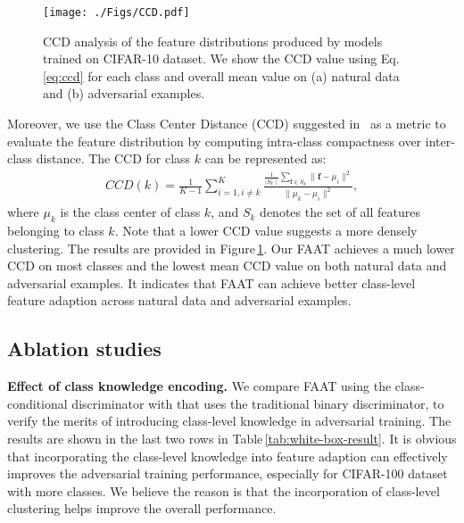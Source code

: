 \documentclass[10pt,twocolumn,letterpaper]{article}
\begin{document}
\begin{figure}[!t]
\centering
\texttt{[image: ./Figs/CCD.pdf]}
    \caption{CCD analysis of the feature distributions produced by models trained on CIFAR-10 dataset. We show the CCD value using Eq.\,\eqref{eq:ccd} for each class and overall mean value on (a) natural data and (b) adversarial examples.}
\label{fig:ccd}
\end{figure}

Moreover, we use the Class Center Distance (CCD) suggested in~\cite{Haoran_2020_ECCV} as a metric to evaluate the feature distribution by computing intra-class compactness over inter-class distance. The CCD for class $k$ can be represented as:
\begin{equation}
\begin{aligned}
\label{eq:ccd}
		CCD(k)=\frac{1}{K-1}\sum \limits_{i=1,i\neq k} ^{K}\frac{\frac{1}{\mid S_k\mid}\sum_{\mathbf{f}\in S_k}\|\mathbf{f}-\mu_i\|^2}{\|\mu_k-\mu_i\|^2},
\end{aligned}
\end{equation}
where $\mu_k$ is the class center of class $k$, and $S_k$ denotes the set of all features belonging to class $k$. Note that a lower CCD value suggests a more densely clustering. The results are provided in Figure\,\ref{fig:ccd}. Our FAAT achieves a much lower CCD on most classes and the lowest mean CCD value on both natural data and adversarial examples. It indicates that FAAT can achieve better class-level feature adaption across natural data and adversarial examples.



\subsection{Ablation studies}\label{sec:ablation}
\noindent\textbf{Effect of class knowledge encoding.} We compare FAAT using the class-conditional discriminator with that uses the traditional binary discriminator, to verify the merits of introducing class-level knowledge in adversarial training. The results are shown in the last two rows in Table\,\ref{tab:white-box-result}. It is obvious that incorporating the class-level knowledge into feature adaption can effectively improves the adversarial training performance, especially for CIFAR-100 dataset with more classes. We believe the reason is that the incorporation of class-level clustering helps improve the overall performance.
\vspace{5pt}
\end{document}
